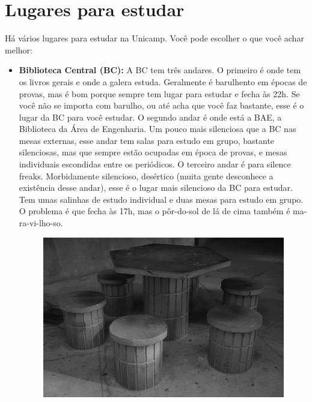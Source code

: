 
\section{Lugares para estudar}

Há vários lugares para estudar na Unicamp. Você pode escolher o que você achar
melhor:

\begin{itemize}
    \item  \textbf{Biblioteca Central (BC):} A BC tem três andares. O primeiro é
        onde tem os livros gerais e onde a galera estuda. Geralmente é
        barulhento em épocas de provas, mas é bom porque sempre tem lugar para
        estudar e fecha às 22h.  Se você não se importa com barulho, ou até acha
        que você faz bastante, esse é o lugar da BC para você estudar. O segundo
        andar é onde está a BAE, a Biblioteca da Área de Engenharia. Um pouco
        mais silenciosa que a BC nas mesas externas, esse andar tem salas para
        estudo em grupo, bastante silenciosas, mas que sempre estão ocupadas em
        época de provas, e mesas individuais escondidas entre os periódicos. O
        terceiro andar é para silence freaks. Morbidamente silencioso, desértico
        (muita gente desconhece a existência desse andar), esse é o lugar mais
        silencioso da BC para estudar. Tem umas salinhas de estudo individual e
        duas mesas para estudo em grupo. O problema é que fecha às 17h, mas o
        pôr-do-sol de lá de cima também é ma-ra-vi-lho-so.

        \begin{figure}[h!]
            \centering
            \includegraphics[scale=0.60, keepaspectratio=true]{img/imgs/11-lugares_estudar/-072.jpg}
        \end{figure}


\end{itemize}
